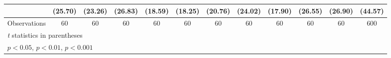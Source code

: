 \begin{table}[htbp]
\begin{tabular}{l*{11}{c}}
                    &     (25.70)         &     (23.26)         &     (26.83)         &     (18.59)         &     (18.25)         &     (20.76)         &     (24.02)         &     (17.90)         &     (26.55)         &     (26.90)         &     (44.57)         \\
\hline
Observations        &          60         &          60         &          60         &          60         &          60         &          60         &          60         &          60         &          60         &          60         &         600         \\
\hline\hline
\multicolumn{12}{l}{\footnotesize \textit{t} statistics in parentheses}\\
\multicolumn{12}{l}{\footnotesize \sym{*} \(p<0.05\), \sym{**} \(p<0.01\), \sym{***} \(p<0.001\)}\\
\end{tabular}
\end{table}
